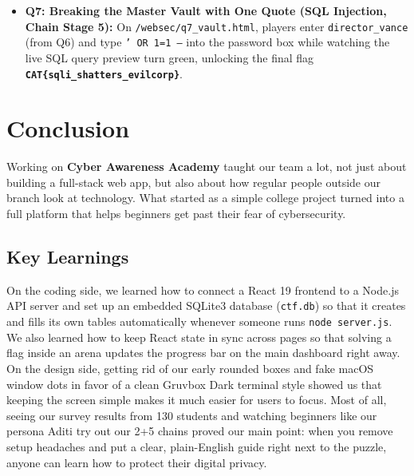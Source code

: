 \documentclass[11pt,a4paper]{article}
\begin{document}
\begin{itemize}
    \item \textbf{Q7: Breaking the Master Vault with One Quote (SQL Injection, Chain Stage 5):} On \texttt{/websec/q7\_vault.html}, players enter \texttt{director\_vance} (from Q6) and type \texttt{' OR 1=1 --} into the password box while watching the live SQL query preview turn green, unlocking the final flag \textbf{\texttt{CAT\{sqli\_shatters\_evilcorp\}}}.
\end{itemize}

\clearpage

\section{Conclusion}

Working on \textbf{Cyber Awareness Academy} taught our team a lot, not just about building a full-stack web app, but also about how regular people outside our branch look at technology. What started as a simple college project turned into a full platform that helps beginners get past their fear of cybersecurity.

\subsection{Key Learnings}
On the coding side, we learned how to connect a React 19 frontend to a Node.js API server and set up an embedded SQLite3 database (\texttt{ctf.db}) so that it creates and fills its own tables automatically whenever someone runs \texttt{node server.js}. We also learned how to keep React state in sync across pages so that solving a flag inside an arena updates the progress bar on the main dashboard right away. On the design side, getting rid of our early rounded boxes and fake macOS window dots in favor of a clean Gruvbox Dark terminal style showed us that keeping the screen simple makes it much easier for users to focus. Most of all, seeing our survey results from 130 students and watching beginners like our persona Aditi try out our 2+5 chains proved our main point: when you remove setup headaches and put a clear, plain-English guide right next to the puzzle, anyone can learn how to protect their digital privacy.
\end{document}
